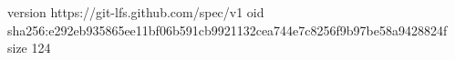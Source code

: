 version https://git-lfs.github.com/spec/v1
oid sha256:e292eb935865ee11bf06b591cb9921132cea744e7c8256f9b97be58a9428824f
size 124
